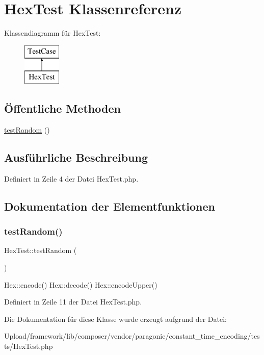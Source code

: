\hypertarget{class_hex_test}{}\section{Hex\+Test Klassenreferenz}
\label{class_hex_test}
Klassendiagramm für Hex\+Test\+:\begin{figure}[H]
\begin{center}
\leavevmode
\includegraphics[height=2.000000cm]{class_hex_test}
\end{center}
\end{figure}
\subsection*{Öffentliche Methoden}
\begin{DoxyCompactItemize}
\item 
\mbox{\hyperlink{class_hex_test_a71e130550af6df59ddf2db2bae08d5e1}{test\+Random}} ()
\end{DoxyCompactItemize}


\subsection{Ausführliche Beschreibung}


Definiert in Zeile 4 der Datei Hex\+Test.\+php.



\subsection{Dokumentation der Elementfunktionen}
\mbox{\label{class_hex_test_a71e130550af6df59ddf2db2bae08d5e1}} 
\subsubsection{\texorpdfstring{test\+Random()}{testRandom()}}
{\footnotesize\ttfamily Hex\+Test\+::test\+Random (\begin{DoxyParamCaption}{ }\end{DoxyParamCaption})}

Hex\+::encode()  Hex\+::decode()  Hex\+::encode\+Upper() 

Definiert in Zeile 11 der Datei Hex\+Test.\+php.



Die Dokumentation für diese Klasse wurde erzeugt aufgrund der Datei\+:\begin{DoxyCompactItemize}
\item 
Upload/framework/lib/composer/vendor/paragonie/constant\+\_\+time\+\_\+encoding/tests/Hex\+Test.\+php\end{DoxyCompactItemize}
